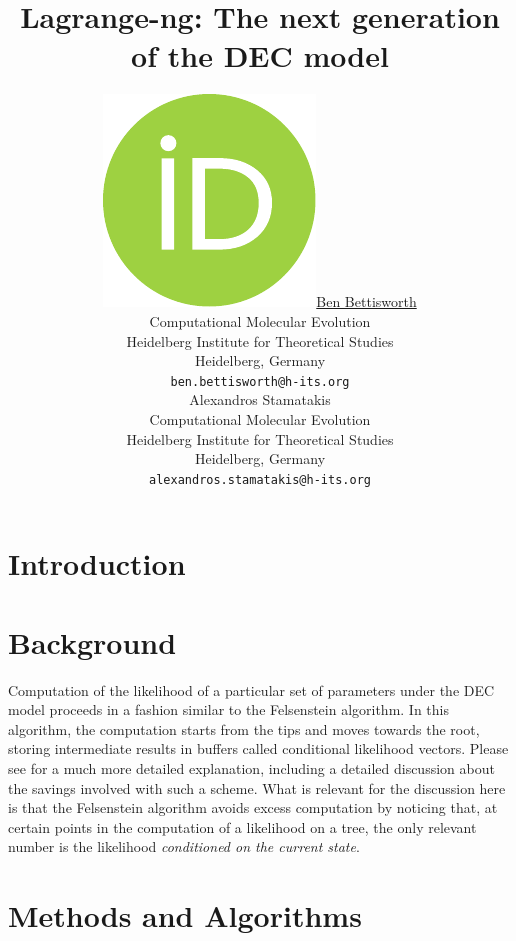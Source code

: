 \documentclass{article}
\title{Lagrange-ng: The next generation of the DEC model}
\author{\href{https://orcid.org/0000-0002-9130-6878}{\includegraphics[scale=0.06]{orcid.pdf}\hspace{1mm}Ben Bettisworth}\\
  Computational Molecular Evolution\\
  Heidelberg Institute for Theoretical Studies\\
  Heidelberg, Germany \\
  \texttt{ben.bettisworth@h-its.org} \\
  \And
  Alexandros Stamatakis\\
  Computational Molecular Evolution\\
  Heidelberg Institute for Theoretical Studies\\
  Heidelberg, Germany\\
  \texttt{alexandros.stamatakis@h-its.org} \\
}
\begin{document}
\maketitle

\begin{abstract}
\end{abstract}


\section{Introduction}

\section{Background}

Computation of the likelihood of a particular set of parameters under the DEC model proceeds in a fashion similar to the
Felsenstein algorithm. In this algorithm, the computation starts from the tips and moves towards the root, storing
intermediate results in buffers called conditional likelihood vectors. Please see \cite{yang2006computational} for a
much more detailed explanation, including a detailed discussion about the savings involved with such a scheme. What is
relevant for the discussion here is that the Felsenstein algorithm avoids excess computation by noticing that, at
certain points in the computation of a likelihood on a tree, the only relevant number is the likelihood
\textit{conditioned on the current state}.

\section{Methods and Algorithms}
\label{sec:methods}
\end{document}
